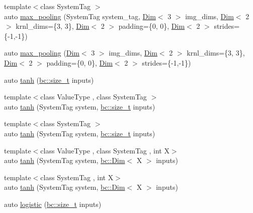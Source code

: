 \begin{DoxyCompactItemize}
\item 
{\footnotesize template$<$class System\+Tag $>$ }\\auto \hyperlink{namespacebc_1_1nn_a03cb186fd7f64df5668d4c6ada3047c7}{max\+\_\+pooling} (System\+Tag system\+\_\+tag, \hyperlink{structbc_1_1Dim}{Dim}$<$ 3 $>$ img\+\_\+dims, \hyperlink{structbc_1_1Dim}{Dim}$<$ 2 $>$ krnl\+\_\+dims=\{3, 3\}, \hyperlink{structbc_1_1Dim}{Dim}$<$ 2 $>$ padding=\{0, 0\}, \hyperlink{structbc_1_1Dim}{Dim}$<$ 2 $>$ strides=\{-\/1,-\/1\})
\item 
auto \hyperlink{namespacebc_1_1nn_ad265b01898441246ba30799156b0158b}{max\+\_\+pooling} (\hyperlink{structbc_1_1Dim}{Dim}$<$ 3 $>$ img\+\_\+dims, \hyperlink{structbc_1_1Dim}{Dim}$<$ 2 $>$ krnl\+\_\+dims=\{3, 3\}, \hyperlink{structbc_1_1Dim}{Dim}$<$ 2 $>$ padding=\{0, 0\}, \hyperlink{structbc_1_1Dim}{Dim}$<$ 2 $>$ strides=\{-\/1,-\/1\})
\item 
auto \hyperlink{namespacebc_1_1nn_a0f16fef3ad5fcb1481ba386da77a8208}{tanh} (\hyperlink{namespacebc_aaf8e3fbf99b04b1b57c4f80c6f55d3c5}{bc\+::size\+\_\+t} inputs)
\item 
{\footnotesize template$<$class Value\+Type , class System\+Tag $>$ }\\auto \hyperlink{namespacebc_1_1nn_a852717a17dfaf0dee293b5765dfc5528}{tanh} (System\+Tag system, \hyperlink{namespacebc_aaf8e3fbf99b04b1b57c4f80c6f55d3c5}{bc\+::size\+\_\+t} inputs)
\item 
{\footnotesize template$<$class System\+Tag $>$ }\\auto \hyperlink{namespacebc_1_1nn_a1ef53f76e9c68aa315b86accaf67cf67}{tanh} (System\+Tag system, \hyperlink{namespacebc_aaf8e3fbf99b04b1b57c4f80c6f55d3c5}{bc\+::size\+\_\+t} inputs)
\item 
{\footnotesize template$<$class Value\+Type , class System\+Tag , int X$>$ }\\auto \hyperlink{namespacebc_1_1nn_a6b846b0ef196badcc603133bec5e67e9}{tanh} (System\+Tag system, \hyperlink{structbc_1_1Dim}{bc\+::\+Dim}$<$ X $>$ inputs)
\item 
{\footnotesize template$<$class System\+Tag , int X$>$ }\\auto \hyperlink{namespacebc_1_1nn_a1146aec7724cb368342261c32b77341b}{tanh} (System\+Tag system, \hyperlink{structbc_1_1Dim}{bc\+::\+Dim}$<$ X $>$ inputs)
\item 
auto \hyperlink{namespacebc_1_1nn_a377a17e29fde2477e1098bc74ff38963}{logistic} (\hyperlink{namespacebc_aaf8e3fbf99b04b1b57c4f80c6f55d3c5}{bc\+::size\+\_\+t} inputs)
\item 

\end{DoxyCompactItemize}
